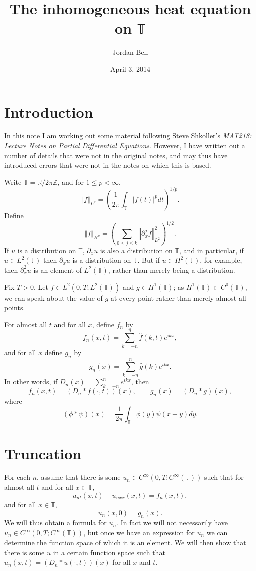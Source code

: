 \documentclass{article}
\newcommand{\norm}[1]{\left\Vert #1 \right\Vert}
\begin{document}
\title{The inhomogeneous heat equation on $\mathbb{T}$}
\author{Jordan Bell}
\date{April 3, 2014}

\maketitle
\section{Introduction}
In this note I am working out some material following Steve Shkoller's {\em MAT218: Lecture Notes on Partial Differential Equations}. However, I have written out a number of details that were not in the original notes, and may thus have introduced errors that were not in the notes on which this is
based.

Write
$\mathbb{T}=\mathbb{R}/2\pi \mathbb{Z}$, and
for $1 \leq p < \infty$,
\[
\norm{f}_{L^p}=\left( \frac{1}{2\pi} \int_\mathbb{T} |f(t)|^p dt \right)^{1/p}.
\]
Define
\[
\norm{f}_{H^k}=\left( \sum_{0 \leq j \leq k} \norm{\partial_x^j f}_{L^2}^2 \right)^{1/2}.
\]
If $u$ is a distribution on $\mathbb{T}$, $\partial_x u$ is also a distribution on $\mathbb{T}$, and in particular, if $u \in L^2(\mathbb{T})$ then
$\partial_x u$ is a distribution on $\mathbb{T}$. But if $u \in H^2(\mathbb{T})$, for example, then $\partial_x^2 u$ is an element of  $L^2(\mathbb{T})$, rather than
merely being a distribution.

Fix $T>0$. Let $f \in L^2(0,T;L^2(\mathbb{T}))$ and $g \in H^1(\mathbb{T})$; as $H^1(\mathbb{T}) \subset C^0(\mathbb{T})$, we can
speak about the value of $g$ at every point rather than merely almost all points.

For almost all $t$ and for all $x$, define $f_n$ by
\[
f_n(x,t)=\sum_{k=-n}^n \hat{f}(k,t) e^{ikx},
\]
and for all $x$ define $g_n$ by
\[
g_n(x)=\sum_{k=-n}^n \hat{g}(k) e^{ikx}.
\]
In other words, if $D_n(x)=\sum_{k=-n}^n e^{ikx}$, then
\[
f_n(x,t)=(D_n * f(\cdot,t))(x), \qquad g_n(x)=(D_n * g)(x),
\]
where
\[
(\phi * \psi)(x)=\frac{1}{2\pi} \int_\mathbb{T} \phi(y)\psi(x-y)dy.
\]

\section{Truncation}
For each $n$, assume that there is some $u_n \in C^\infty(0,T; C^\infty(\mathbb{T}))$ such that for almost all $t$ and for  all
$x \in \mathbb{T}$,
\begin{equation}
u_{nt}(x,t)-u_{nxx}(x,t)=f_n(x,t),
\label{npde}
\end{equation}
and for all $x \in \mathbb{T}$,
\[
u_n(x,0)=g_n(x).
\]
We will thus obtain a formula for $u_n$. In fact we will not necessarily have  $u_n \in C^\infty(0,T; C^\infty(\mathbb{T}))$, but once we have
an expression for $u_n$ we can determine the function space of which it is an element. We will then show that there is some $u$ in a certain function
space such that $u_n(x,t)=(D_n * u(\cdot, t))(x)$ for all $x$ and $t$.
\end{document}
